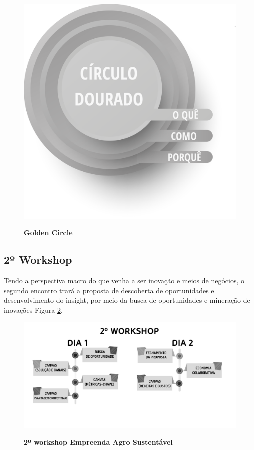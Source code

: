 \begin{figure}[!h]
\centering
\caption{\textbf{Golden Circle}}
\includegraphics[scale=0.3]{Imagens/circulo_dourado.png}
\label{figura_5}
\end{figure}

\subsection{2º Workshop}

Tendo a perspectiva macro do que venha a ser inovação e meios de negócios, o segundo encontro trará a proposta de descoberta de oportunidades e desenvolvimento do insight, por meio da busca de oportunidades e mineração de inovações Figura \ref{figura_31}.


\begin{figure}[!h]
\centering
\caption{\textbf{2º workshop Empreenda Agro Sustentável}}
\includegraphics[scale=0.3]{Imagens/workshop-02.png}
\label{figura_31}
\end{figure}


